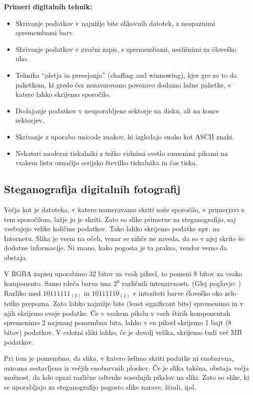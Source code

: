     \textbf{Primeri digitalnih tehnik:}
    \begin{itemize}
        \item Skrivanje podatkov v najnižje bite slikovnih datotek, z neopaznimi spremembami barv.
        \item Skrivanje podatkov v zvočni zapis, s spremembami, neslišnimi za človeško uho.
        \item Tehnika ``pletja in presejanja'' (chaffing and winnowing), kjer gre za to da paketkom, ki gredo čez nezavarovano povezavo dodamo lažne paketke, v katere lahko skrijemo sporočilo.
        \item Dodajanje podatkov v neuporabljene sektorje na disku, ali na konce sektorjev.
        \item Skrivanje z uporabo unicode znakov, ki izgledajo enako kot ASCII znaki.
        \item Nekateri moderni tiskalniki z težko vidnimi svetlo rumenimi pikami na vsakem listu označijo serijsko številko tiskalnika in čas tiska.
        \cite{wikipedia}
    \end{itemize}

\subsection{Steganografija digitalnih fotografij}
    \label{steganografijaslik}
    Večja kot je datoteka, v katero nameravamo skriti naše sporočilo, v primerjavi z tem sporočilom, lažje jo je skriti. Zato so slike primerne za steganografijo, saj vsebujejo velike količine podatkov. Tako lahko skrijemo podatke npr. na Internetu. Slika je vsem na očeh, venar se nihče ne zaveda, da so v njej skrite še dodatne informacije. Ni znano, kako pogosta je ta praksa, vendar vemo da obstaja.

    V RGBA zapisu uporabimo 32 bitov za vsak piksel, to pomeni 8 bitov za vsako komponento. Samo rdeča barva ima $2^8$ različnih intenzivnosti. (Glej poglavje: ) Razliko med $10111111_{(2)}$ in $10111110_{(2)}$ v inteziteti barve človeško oko zelo težko prepozna. Zato lahko najnižje bite (least significant bits) spremenimo in v njih skrijemo svoje podatke. Če v vsakem pikslu v vseh štirih komponentah spremenimo 2 najmanj pomembna bita, lahko v en piksel skrijemo 1 bajt (8 bitov) podatkov. V celotni sliki lahko, če je dovolj velika, skrijemo tudi več MB podatkov.

    Pri tem je pomembno, da slika, v katero želimo skriti podatke ni enobarvna, oziroma sestavljena iz večjih enobarvnih ploskev. Če je slika takšna, obstaja večja možnost, da kdo opazi različne odtenke sosednjih pikslov na sliki. Zato so slike, ki se uporabljajo za steganografijo pogosto slike narave, živali, ipd.

